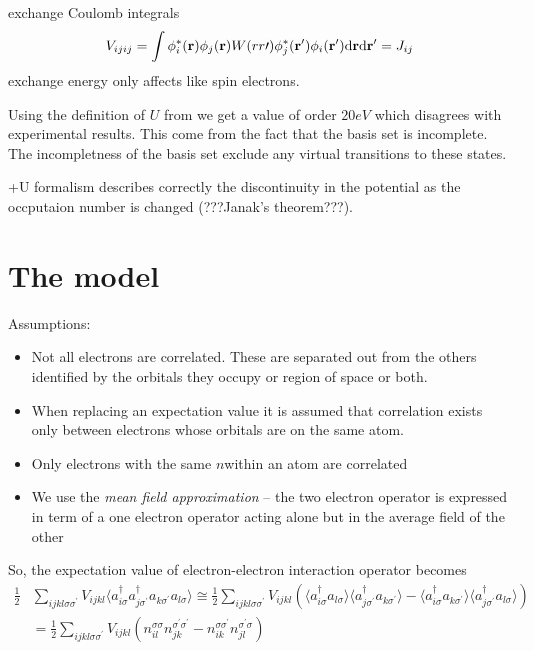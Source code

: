 exchange Coulomb integrals
\begin{equation}
V_{ijij}=\int\phi_{i}^{*}({\bf r})\phi_{j}({\bf r})W(rr\prime)\phi_{j}^{*}({\bf r^\prime})\phi_{i}({\bf r^\prime})\text{d}{\bf r}\text{d}{\bf r^\prime}=J_{ij}
\end{equation}
exchange energy only affects like spin electrons.
\par{Using the definition of $U$ from  we get a value of order $20eV$ which
disagrees with experimental results. This come from the fact that the basis set is incomplete.
The incompletness of the basis set exclude any virtual transitions to these states.}
\par{+U formalism describes correctly the discontinuity in the potential as the occputaion number is changed (???Janak's theorem???).}
\section{The model}
\par{Assumptions:}
\begin{itemize}
\item{Not all electrons are correlated. These are separated out from the others identified by the orbitals they occupy or region of space or both.}
\item{When replacing an expectation value it is assumed that correlation exists only between electrons whose orbitals are on the same atom. }
\item{Only electrons with the same $n$within an atom are correlated}
\item {We use the \textit{mean field approximation} -- the two electron operator is expressed in term of a one electron operator acting alone but in the average field of the other}
\end{itemize}
\par{So, the expectation value of electron-electron interaction operator becomes}
\begin{equation}
\begin{split}
\frac{1}{2}&\sum_{ijkl\sigma\sigma^\prime}V_{ijkl}\langle a_{i\sigma}^{\dag}a_{j\sigma^\prime}^{\dag}a_{k\sigma^\prime}a_{l\sigma}\rangle
\cong \frac{1}{2}\sum_{ijkl\sigma\sigma^\prime}V_{ijkl}(\langle a_{i\sigma}^{\dag}a_{l\sigma} \rangle \langle a_{j\sigma^\prime}^{\dag}a_{k\sigma^\prime} \rangle -
\langle a_{i\sigma}^{\dag}a_{k\sigma^\prime}\rangle \langle a_{j\sigma^\prime}^{\dag}a_{l\sigma} \rangle )\\
&=\frac{1}{2}\sum_{ijkl\sigma\sigma^\prime}V_{ijkl}(n_{il}^{\sigma\sigma}n_{jk}^{\sigma^\prime\sigma^\prime}-
n_{ik}^{\sigma\sigma^\prime}n_{jl}^{\sigma^\prime\sigma})
\end{split}
\end{equation}
